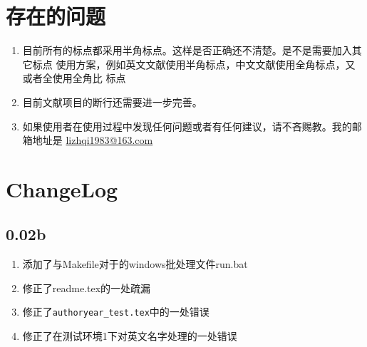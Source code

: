 \documentclass{article}
\begin{document}
\section{存在的问题}
	\begin{enumerate}
		\item 目前所有的标点都采用半角标点。这样是否正确还不清楚。是不是需要加入其它标点
			使用方案，例如英文文献使用半角标点，中文文献使用全角标点，又或者全使用全角比
			标点
		\item 目前文献项目的断行还需要进一步完善。
		\item 如果使用者在使用过程中发现任何问题或者有任何建议，请不吝赐教。我的邮箱地址是
		\url{lizhqi1983@163.com}
	\end{enumerate}
	
\section{ChangeLog}
\subsection{0.02b}
	\begin{enumerate}
	\item 添加了与Makefile对于的windows批处理文件run.bat
	\item 修正了readme.tex的一处疏漏
	\item 修正了\verb|authoryear_test.tex|中的一处错误
	\item 修正了在测试环境1下对英文名字处理的一处错误
	\end{enumerate}
\end{document}
